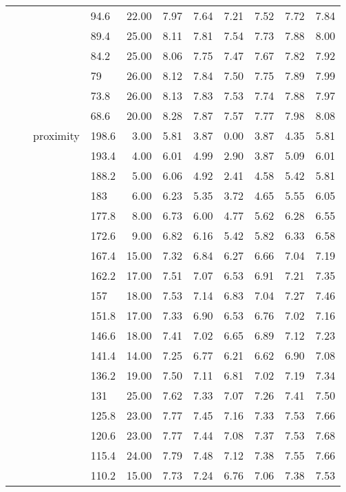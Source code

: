 \begin{longtable}{llllrrrrrrr}
   &  &  & 94.6 & 22.00 & 7.97 & 7.64 & 7.21 & 7.52 & 7.72 & 7.84 \\ 
   &  &  & 89.4 & 25.00 & 8.11 & 7.81 & 7.54 & 7.73 & 7.88 & 8.00 \\ 
   &  &  & 84.2 & 25.00 & 8.06 & 7.75 & 7.47 & 7.67 & 7.82 & 7.92 \\ 
   &  &  & 79 & 26.00 & 8.12 & 7.84 & 7.50 & 7.75 & 7.89 & 7.99 \\ 
   &  &  & 73.8 & 26.00 & 8.13 & 7.83 & 7.53 & 7.74 & 7.88 & 7.97 \\ 
   &  &  & 68.6 & 20.00 & 8.28 & 7.87 & 7.57 & 7.77 & 7.98 & 8.08 \\ 
   &  & proximity & 198.6 & 3.00 & 5.81 & 3.87 & 0.00 & 3.87 & 4.35 & 5.81 \\ 
   &  &  & 193.4 & 4.00 & 6.01 & 4.99 & 2.90 & 3.87 & 5.09 & 6.01 \\ 
   &  &  & 188.2 & 5.00 & 6.06 & 4.92 & 2.41 & 4.58 & 5.42 & 5.81 \\ 
   &  &  & 183 & 6.00 & 6.23 & 5.35 & 3.72 & 4.65 & 5.55 & 6.05 \\ 
   &  &  & 177.8 & 8.00 & 6.73 & 6.00 & 4.77 & 5.62 & 6.28 & 6.55 \\ 
   &  &  & 172.6 & 9.00 & 6.82 & 6.16 & 5.42 & 5.82 & 6.33 & 6.58 \\ 
   &  &  & 167.4 & 15.00 & 7.32 & 6.84 & 6.27 & 6.66 & 7.04 & 7.19 \\ 
   &  &  & 162.2 & 17.00 & 7.51 & 7.07 & 6.53 & 6.91 & 7.21 & 7.35 \\ 
   &  &  & 157 & 18.00 & 7.53 & 7.14 & 6.83 & 7.04 & 7.27 & 7.46 \\ 
   &  &  & 151.8 & 17.00 & 7.33 & 6.90 & 6.53 & 6.76 & 7.02 & 7.16 \\ 
   &  &  & 146.6 & 18.00 & 7.41 & 7.02 & 6.65 & 6.89 & 7.12 & 7.23 \\ 
   &  &  & 141.4 & 14.00 & 7.25 & 6.77 & 6.21 & 6.62 & 6.90 & 7.08 \\ 
   &  &  & 136.2 & 19.00 & 7.50 & 7.11 & 6.81 & 7.02 & 7.19 & 7.34 \\ 
   &  &  & 131 & 25.00 & 7.62 & 7.33 & 7.07 & 7.26 & 7.41 & 7.50 \\ 
   &  &  & 125.8 & 23.00 & 7.77 & 7.45 & 7.16 & 7.33 & 7.53 & 7.66 \\ 
   &  &  & 120.6 & 23.00 & 7.77 & 7.44 & 7.08 & 7.37 & 7.53 & 7.68 \\ 
   &  &  & 115.4 & 24.00 & 7.79 & 7.48 & 7.12 & 7.38 & 7.55 & 7.66 \\ 
   &  &  & 110.2 & 15.00 & 7.73 & 7.24 & 6.76 & 7.06 & 7.38 & 7.53 \\ 

\end{longtable}
